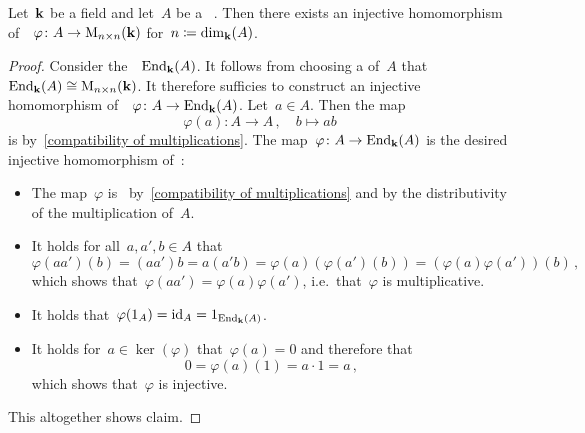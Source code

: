 \begin{lemma}
  Let~$\mathbf{k}$ be a field and let~$A$ be a {\fd}~{\kalg}.
  Then there exists an injective homomorphism of~{\kalgs}~$\varphi \colon A \to \operatorname{M}_{n \times n}(\mathbf{k})$ for~$n \coloneqq \dim_{\mathbf{k}}(A)$.
\end{lemma}


\begin{proof}
  Consider the~{\kalg}~$\operatorname{End}_{\mathbf{k}}(A)$.
  It follows from choosing a  of~$A$ that~$\operatorname{End}_{\mathbf{k}}(A) \cong \operatorname{M}_{n \times n}(\mathbf{k})$.
  It therefore sufficies to construct an injective homomorphism of~{\kalgs}~$\varphi \colon A \to \operatorname{End}_{\mathbf{k}}(A)$.
  Let~$a \in A$.
  Then the map
  \[
            \varphi(a)
    \colon  A
    \to     A \,,
    \quad   b
    \mapsto ab
  \]
  is {\klin} by~\eqref{compatibility of multiplications}.
  The map~$\varphi \colon A \to \operatorname{End}_{\mathbf{k}}(A)$ is the desired injective homomorphism of~{\kalgs}:
  \begin{itemize}
    \item
      The map~$\varphi$ is~{\klin} by~\eqref{compatibility of multiplications} and by the distributivity of the multiplication of~$A$.
    \item
      It holds for all~$a, a', b \in A$ that
      \[
          \varphi(a a')(b)
        = (a a') b
        = a (a' b)
        = \varphi(a)( \varphi(a')(b) )
        = (\varphi(a) \varphi(a'))(b) \,,
      \]
      which shows that~$\varphi(a a') = \varphi(a) \varphi(a')$, i.e.\ that~$\varphi$ is multiplicative.
    \item
      It holds that~$\varphi(1_A) = \operatorname{id}_A = 1_{\operatorname{End}_{\mathbf{k}}(A)}$.
    \item
      It holds for~$a \in \ker(\varphi)$ that~$\varphi(a) = 0$ and therefore that
      \[
          0
        = \varphi(a)(1)
        = a \cdot 1
        = a \,,
      \]
      which shows that~$\varphi$ is injective.
  \end{itemize}
  This altogether shows claim.
\end{proof}








